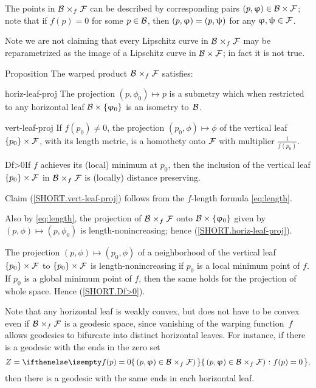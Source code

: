 The points in $\spc{B}\warp f\spc{F}$ can be described by corresponding pairs $(p,\phi)\in\spc{B}\times\spc{F}$; note that if $f(p)=0$ for some $p\in \spc{B}$, then $(p,\phi)\z=(p,\psi)$ for any $\phi,\psi\in \spc{F}$.

Note we are not claiming that every Lipschitz curve in $\spc{B}\warp f \spc{F}$ may be reparametrized as the image of a Lipschitz curve in $\spc{B}\times \spc{F}$; in fact it is not true.

\begin{thm}{Proposition}
The warped product $\spc{\spc{B}}\warp{f}\spc{F}$ satisfies:

\begin{subthm}{horiz-leaf-proj}
The projection $(p,\phi_0)\mapsto p$ is a submetry which when restricted to any horizontal leaf $\spc{B}\times\{\phi_0\}$
is an isometry to~$\mathcal{B}$.
\end{subthm}

\begin{subthm}{vert-leaf-proj}
If $f(p_0)\ne0$, the projection $(p_0,\phi)\mapsto \phi$ of the vertical leaf $\{p_0\}\times \spc{F}$, with its length metric,  is a homothety onto $\mathcal{F}$ with multiplier $\tfrac1{f(p_0)}$.
\end{subthm}

\begin{subthm}{Df>0}If  $f$ achieves its (local) minimum at $p_0$, then the inclusion of the vertical leaf $\{p_0\} \times \spc{F}$ in $\spc{B}\warp{f}\spc{F}$ is (locally) distance preserving.
\end{subthm}

\end{thm}


Claim  (\ref{SHORT.vert-leaf-proj}) follows from the $f$-length formula \ref{eq:length}.

Also by \ref{eq:length}, the projection of
$\spc{B}\warp{f}\spc{F}$ onto $\spc{B}\times\{\phi_0\}$ given by  $(p,\phi)\mapsto (p,\phi_0)$ is length-nonincreasing; hence (\ref{SHORT.horiz-leaf-proj}).

The projection $(p,\phi)\mapsto (p_0,\phi)$ of a neighborhood of the vertical leaf $\{p_0\} \times \spc{F}$ to $\{p_0\} \times \spc{F}$ is length-nonincreasing if $p_0$ is a local minimum point of $f$. 
If $p_0$ is a global minimum point of $f$, then the same holds for the projection of whole space.
Hence (\ref{SHORT.Df>0}).
\qeds

Note that any horizontal leaf is weakly convex, but does not have to be convex even if $\spc{B}\warp{f}\spc{F}$ is a geodesic space, since vanishing of the warping function~$f$ allows geodesics to bifurcate into distinct horizontal leaves.
For instance, if there is a geodesic with the ends in the zero set 
\[Z=\set{(p,\phi)\in\spc{B} \warp{f}\spc{F})}{f(p)=0},\] 
then there is a geodesic with the same ends in each horizontal leaf.

